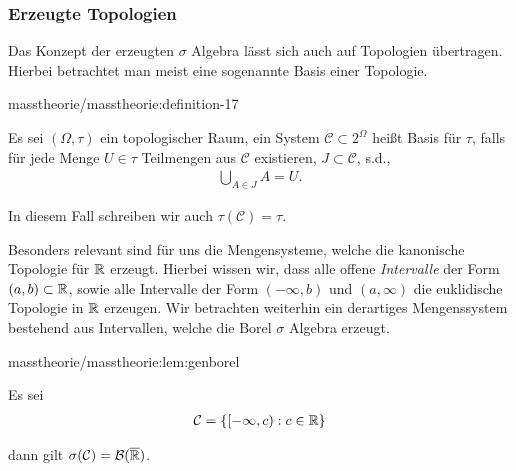 \subsubsection{Erzeugte Topologien}
\label{\detokenize{masstheorie/masstheorie:erzeugte-topologien}}\label{\detokenize{masstheorie/masstheorie:s-gentop}}
\par
Das Konzept der erzeugten \(\sigma\) Algebra lässt sich auch auf Topologien übertragen. Hierbei betrachtet man meist eine sogenannte Basis einer Topologie.
\begin{definition}{}{masstheorie/masstheorie:definition-17}



\par
Es sei \((\Omega,\tau)\) ein topologischer Raum, ein System \(\mathcal{C}\subset 2^\Omega\) heißt Basis für \(\tau\), falls für jede Menge \(U\in\tau\) Teilmengen aus \(\mathcal{C}\) existieren, \(J\subset\mathcal{C}\), s.d.,
\begin{align*}
\bigcup_{A\in J} A = U.
\end{align*}
\par
In diesem Fall schreiben wir auch \(\tau(\mathcal{C})=\tau\).
\end{definition}

\par
Besonders relevant sind für uns die Mengensysteme, welche die kanonische Topologie für \(\mathbb{R}\) erzeugt. Hierbei wissen wir, dass alle offene \emph{Intervalle} der Form \((a,b)\subset \mathbb{R}\), sowie alle Intervalle der Form \((-\infty, b)\) und \((a, \infty)\) die euklidische Topologie in \(\mathbb{R}\) erzeugen. Wir betrachten weiterhin ein derartiges Mengenssystem bestehend aus Intervallen, welche die Borel \(\sigma\) Algebra erzeugt.
\begin{lemma}{}{masstheorie/masstheorie:lem:genborel}



\par
Es sei
\begin{align*}
\mathcal{C} = \{ [-\infty, c):c\in\mathbb{R}\}
\end{align*}
\par
dann gilt \(\sigma(\mathcal{C}) = \mathcal{B}(\overline{\mathbb{R}})\).
\end{lemma}


